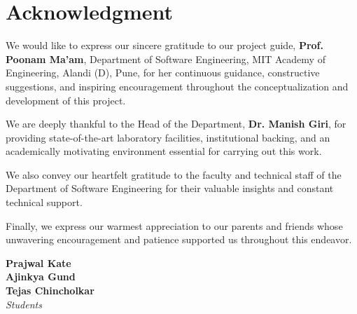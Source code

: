 \documentclass[12pt,a4paper]{report}
\begin{document}
\chapter*{Acknowledgment}

We would like to express our sincere gratitude to our project guide, \textbf{Prof. Poonam Ma'am}, Department of Software Engineering, MIT Academy of Engineering, Alandi (D), Pune, for her continuous guidance, constructive suggestions, and inspiring encouragement throughout the conceptualization and development of this project.

\vspace{0.4cm}
\noindent We are deeply thankful to the Head of the Department, \textbf{Dr. Manish Giri}, for providing state-of-the-art laboratory facilities, institutional backing, and an academically motivating environment essential for carrying out this work.

\vspace{0.4cm}
\noindent We also convey our heartfelt gratitude to the faculty and technical staff of the Department of Software Engineering for their valuable insights and constant technical support.

\vspace{0.4cm}
\noindent Finally, we express our warmest appreciation to our parents and friends whose unwavering encouragement and patience supported us throughout this endeavor.

\vspace{1.5cm}
\begin{flushright}
    \textbf{Prajwal Kate}\\
    \textbf{Ajinkya Gund}\\
    \textbf{Tejas Chincholkar}\\
    \textit{Students}
\end{flushright}

\cleardoublepage

\tableofcontents
\cleardoublepage

\listoffigures
{}
\cleardoublepage

\listoftables
{}
\cleardoublepage

\setcounter{page}{1}
\end{document}
